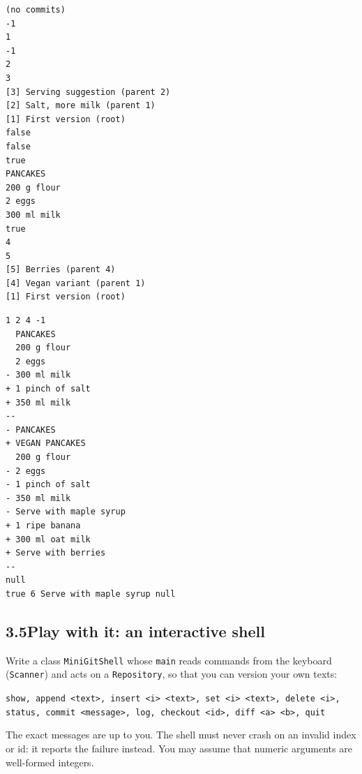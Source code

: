 \documentclass[11pt,a4paper]{article}
\newcommand{\code}[1]{\lstinline[basicstyle=\ttfamily\normalsize,basewidth=0.5em]{#1}}
\begin{document}
\begin{minipage}[t]{0.45\textwidth}
\begin{lstlisting}[style=out]
(no commits)
-1
1
-1
2
3
[3] Serving suggestion (parent 2)
[2] Salt, more milk (parent 1)
[1] First version (root)
false
false
true
PANCAKES
200 g flour
2 eggs
300 ml milk
true
4
5
[5] Berries (parent 4)
[4] Vegan variant (parent 1)
[1] First version (root)
\end{lstlisting}
\end{minipage}\hfill
\begin{minipage}[t]{0.5\textwidth}
\begin{lstlisting}[style=out]
1 2 4 -1
  PANCAKES
  200 g flour
  2 eggs
- 300 ml milk
+ 1 pinch of salt
+ 350 ml milk
--
- PANCAKES
+ VEGAN PANCAKES
  200 g flour
- 2 eggs
- 1 pinch of salt
- 350 ml milk
- Serve with maple syrup
+ 1 ripe banana
+ 300 ml oat milk
+ Serve with berries
--
null
true 6 Serve with maple syrup null
\end{lstlisting}
\end{minipage}

\subsection*{3.5\quad Play with it: an interactive shell}

Write a class \code{MiniGitShell} whose \code{main} reads commands from the
keyboard (\code{Scanner}) and acts on a \code{Repository}, so that you can version
your own texts:
\begin{center}
\texttt{show, append <text>, insert <i> <text>, set <i> <text>, delete <i>,}\\
\texttt{status, commit <message>, log, checkout <id>, diff <a> <b>, quit}
\end{center}
The exact messages are up to you. The shell must never crash on an invalid
index or id: it reports the failure instead. You may assume that numeric
arguments are well-formed integers.
\end{document}
